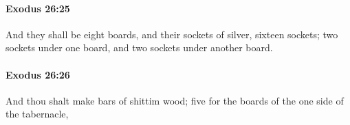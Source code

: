 		\paragraph{Exodus 26:25} %
			\label{EXODUS-26-25}

			And they shall be eight boards, and their sockets of silver, sixteen sockets; two sockets under one board, and two sockets under another board.


		\paragraph{Exodus 26:26} %
			\label{EXODUS-26-26}

			And thou shalt make bars of shittim wood; five for the boards of the one side of the tabernacle,


